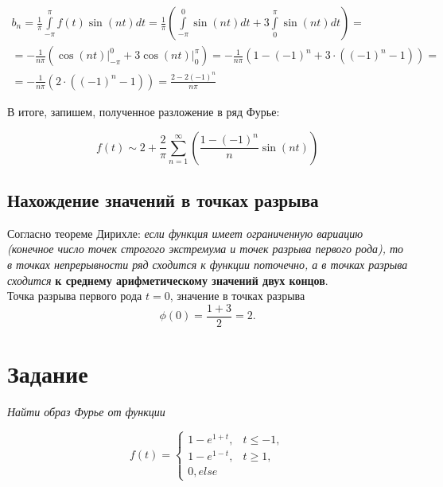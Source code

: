 \documentclass[a5paper, 10pt]{article}
\theoremstyle{definition}
\theoremstyle{plain}
\theoremstyle{remark}
\begin{document}
\begin{multline}
b_n = \frac{1}{\pi} \int \limits_{-\pi}^{\pi} f(t) \sin (nt) dt = \frac{1}{\pi} \left( \int \limits_{-\pi}^{0} \sin (nt) dt  + 3 \int \limits_{0}^{\pi} \sin (nt) dt \right) = \\ =  -\frac{1}{n\pi} \left( \left. \cos (nt) \right|_{-\pi}^{0} + 3 \left. \cos (nt) \right|_{0}^{\pi} \right) = -\frac{1}{n\pi} \left( 1 - (-1)^n + 3 \cdot \left((-1)^n - 1 \right) \right) = \\ = -\frac{1}{n\pi} \left( 2 \cdot \left((-1)^n - 1 \right) \right) = \frac{2 - 2(-1)^n}{n \pi}
\end{multline}

В итоге, запишем, полученное разложение в ряд Фурье:

\begin{equation}
f(t) \sim 2+ \frac{2}{\pi}\sum \limits_{n=1}^{\infty} \left( \frac{1 - (-1)^n}{n} \sin (nt) \right)
\end{equation}


\subsection{Нахождение значений в точках разрыва}
Согласно теореме Дирихле: \textit{если функция имеет ограниченную вариацию (конечное число точек строгого экстремума и точек разрыва первого рода), то в точках непрерывности ряд сходится к функции поточечно, а в точках разрыва сходится }\textbf{к среднему арифметическому значений двух концов}.\\

Точка разрыва первого рода $t = 0$, значение в точках разрыва\\
 $$\phi (0) = \frac{1 + 3}{2} = 2.$$








\newpage
\section{Задание}

\textit{Найти образ Фурье от функции}

\begin{equation}
f(t) = 
\begin{cases}
1 - e^{1 + t}, &  t \leq -1,\\
1 - e^{1 - t}, &  t \geq 1, \\
0, else
\end{cases}
\end{equation}
\end{document}
